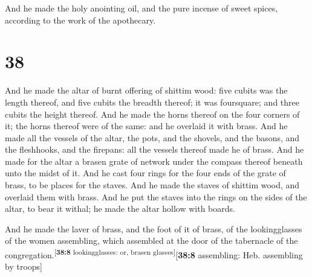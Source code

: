  And he made the holy anointing oil, and the pure incense
of sweet spices, according to the work of the apothecary.

\hypertarget{section-37}{%
\section{38}\label{section-37}}

 And he made the altar of burnt offering of shittim wood:
five cubits was the length thereof, and five cubits the breadth thereof;
it was foursquare; and three cubits the height thereof. 
And he made the horns thereof on the four corners of it; the horns
thereof were of the same: and he overlaid it with brass. 
And he made all the vessels of the altar, the pots, and the shovels, and
the basons, and the fleshhooks, and the firepans: all the vessels
thereof made he of brass.  And he made for the altar a
brasen grate of network under the compass thereof beneath unto the midst
of it.  And he cast four rings for the four ends of the
grate of brass, to be places for the staves.  And he made
the staves of shittim wood, and overlaid them with brass. 
And he put the staves into the rings on the sides of the altar, to bear
it withal; he made the altar hollow with boards.

 And he made the laver of brass, and the foot of it of
brass, of the lookingglasses of the women assembling, which assembled at
the door of the tabernacle of the
congregation.\textsuperscript{{[}\textbf{38:8} lookingglasses: or,
brasen glasses{]}}{[}\textbf{38:8} assembling: Heb. assembling by
troops{]}

